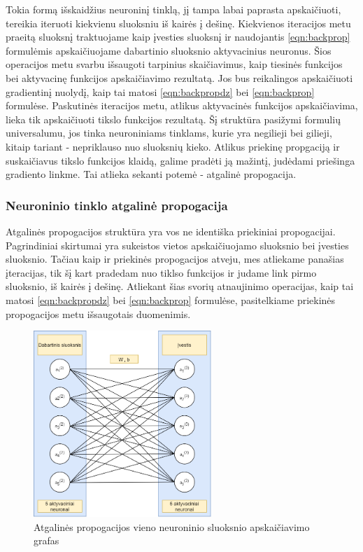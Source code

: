 \documentclass[a4paper, 12pt]{article}
\begin{document}
Tokia formą išskaidžius neuroninį tinklą, jį tampa labai paprasta apskaičiuoti, tereikia iteruoti kiekvienu sluoksniu iš kairės į dešinę. Kiekvienos iteracijos metu praeitą sluoksnį traktuojame kaip įvesties sluoksnį ir naudojantis \ref{eqn:backprop} formulėmis apskaičiuojame dabartinio sluoksnio aktyvacinius neuronus. Šios operacijos metu svarbu išsaugoti tarpinius skaičiavimus, kaip tiesinės funkcijos bei aktyvacinę funkcijos apskaičiavimo rezultatą. Jos bus reikalingos apskaičiuoti gradientinį nuolydį, kaip tai matosi \ref{eqn:backpropdz} bei \ref{eqn:backprop} formulėse. Paskutinės iteracijos metu, atlikus aktyvacinės funkcijos apskaičiavima, lieka tik apskaičiuoti tikslo funkcijos rezultatą. 
Šį struktūra pasižymi formulių universalumu, jos tinka neuroniniams tinklams, kurie yra negilieji bei gilieji, kitaip tariant - nepriklauso nuo sluoksnių kieko. Atlikus priekinę propgaciją ir suskaičiavus tikslo funkcijos klaidą, galime pradėti ją mažintį, judėdami priešinga gradiento linkme. Tai atlieka sekanti potemė - atgalinė propogacija.
	

%
\subsubsection{Neuroninio tinklo atgalinė propogacija}
%

Atgalinės propogacijos struktūra yra vos ne identiška priekiniai propogacijai. Pagrindiniai skirtumai yra sukeistos vietos apskaičiuojamo sluoksnio bei įvesties sluoksnio. Tačiau kaip ir priekinės propogacijos atveju, mes atliekame panašias įteracijas, tik šį kart pradedam nuo tiklso funkcijos ir judame link pirmo sluoksnio, iš kairės į dešinę. Atliekant šias svorių atnaujinimo operacijas, kaip tai matosi \ref{eqn:backpropdz} bei \ref{eqn:backprop} formulėse, pasitelkiame priekinės propogacijos metu išsaugotais duomenimis. 

\begin{figure}[h]
\centering
\includegraphics[width=0.6\textwidth]{BackProp neuronais}
\caption{Atgalinės propogacijos vieno neuroninio sluoksnio apskaičiavimo grafas}
\label{BackProp neuronais}
\end{figure}
\end{document}
